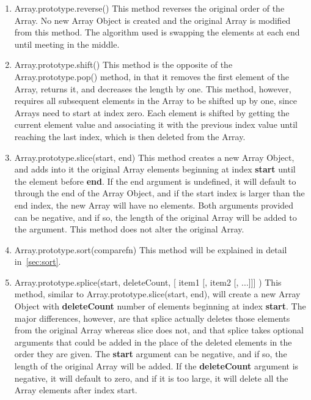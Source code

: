 \documentclass[a4paper,11pt,twoside]{report}
\begin{document}
\begin{enumerate}
\item Array.prototype.reverse() \newline
This method reverses the original order of the Array. No new Array Object is created and the original Array is modified from this method. The algorithm used is swapping the elements at each end until meeting in the middle.

\item Array.prototype.shift() \newline
This method is the opposite of the Array.prototype.pop() method, in that it removes the first element of the Array, returns it, and decreases the length by one. This method, however, requires all subsequent elements in the Array to be shifted up by one, since Arrays need to start at index zero. Each element is shifted by getting the current element value and associating it with the previous index value until reaching the last index, which is then deleted from the Array.

\item Array.prototype.slice(start, end) \newline
This method creates a new Array Object, and adds into it the original Array elements beginning at index \textbf{start} until the element before \textbf{end}. If the end argument is undefined, it will default to through the end of the Array Object, and if the start index is larger than the end index, the new Array will have no elements. Both arguments provided can be negative, and if so, the length of the original Array will be added to the argument. This method does not alter the original Array.

\item Array.prototype.sort(comparefn) \newline
This method will be explained in detail in~\ref{sec:sort}.

\item Array.prototype.splice(start, deleteCount, [ item1 [, item2 [, ...]]] ) \newline
This method, similar to Array.prototype.slice(start, end), will create a new Array Object with \textbf{deleteCount} number of elements beginning at index \textbf{start}. The major differences, however, are that splice actually deletes those elements from the original Array whereas slice does not, and that splice takes optional arguments that could be added in the place of the deleted elements in the order they are given. The \textbf{start} argument can be negative, and if so, the length of the original Array will be added. If the \textbf{deleteCount} argument is negative, it will default to zero, and if it is too large, it will delete all the Array elements after index start. 


\end{enumerate}
\end{document}
